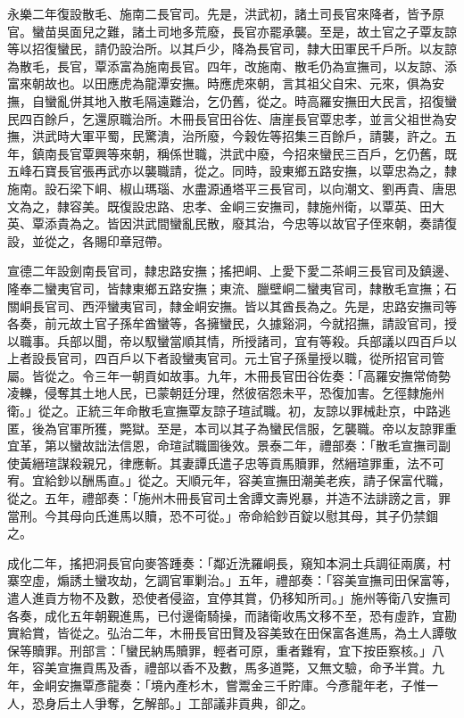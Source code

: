 \begin{pinyinscope}
永樂二年復設散毛、施南二長官司。先是，洪武初，諸土司長官來降者，皆予原官。蠻苗吳面兒之難，諸土司地多荒廢，長官亦罷承襲。至是，故土官之子覃友諒等以招復蠻民，請仍設治所。以其戶少，降為長官司，隸大田軍民千戶所。以友諒為散毛，長官，覃添富為施南長官。四年，改施南、散毛仍為宣撫司，以友諒、添富來朝故也。以田應虎為龍潭安撫。時應虎來朝，言其祖父自宋、元來，俱為安撫，自蠻亂併其地入散毛隔遠難治，乞仍舊，從之。時高羅安撫田大民言，招復蠻民四百餘戶，乞還原職治所。木冊長官田谷佐、唐崖長官覃忠孝，並言父祖世為安撫，洪武時大軍平蜀，民驚潰，治所廢，今穀佐等招集三百餘戶，請襲，許之。五年，鎮南長官覃興等來朝，稱係世職，洪武中廢，今招來蠻民三百戶，乞仍舊，既五峰石寶長官張再武亦以襲職請，從之。同時，設東鄉五路安撫，以覃忠為之，隸施南。設石梁下峒、椒山瑪瑙、水盡源通塔平三長官司，以向潮文、劉再貴、唐思文為之，隸容美。既復設忠路、忠孝、金峒三安撫司，隸施州衛，以覃英、田大英、覃添貴為之。皆因洪武間蠻亂民散，廢其治，今忠等以故官子侄來朝，奏請復設，並從之，各賜印章冠帶。

宣德二年設劍南長官司，隸忠路安撫；搖把峒、上愛下愛二茶峒三長官司及鎮邊、隆奉二蠻夷官司，皆隸東鄉五路安撫；東流、臘壁峒二蠻夷官司，隸散毛宣撫；石關峒長官司、西泙蠻夷官司，隸金峒安撫。皆以其酋長為之。先是，忠路安撫司等各奏，前元故土官子孫牟酋蠻等，各擁蠻民，久據谿洞，今就招撫，請設官司，授以職事。兵部以聞，帝以馭蠻當順其情，所授諸司，宜有等殺。兵部議以四百戶以上者設長官司，四百戶以下者設蠻夷官司。元土官子孫量授以職，從所招官司管屬。皆從之。令三年一朝貢如故事。九年，木冊長官田谷佐奏：「高羅安撫常倚勢凌轢，侵奪其土地人民，已蒙朝廷分理，然彼宿怨未平，恐復加害。乞徑隸施州衛。」從之。正統三年命散毛宣撫覃友諒子瑄試職。初，友諒以罪械赴京，中路逃匿，後為官軍所獲，斃獄。至是，本司以其子為蠻民信服，乞襲職。帝以友諒罪重宜革，第以蠻故詘法信恩，命瑄試職圖後效。景泰二年，禮部奏：「散毛宣撫司副使黃縉瑄謀殺親兄，律應斬。其妻譚氏遣子忠等貢馬贖罪，然縉瑄罪重，法不可宥。宜給鈔以酬馬直。」從之。天順元年，容美宣撫田潮美老疾，請子保富代職，從之。五年，禮部奏：「施州木冊長官司土舍譚文壽兇暴，并造不法誹謗之言，罪當刑。今其母向氏進馬以贖，恐不可從。」帝命給鈔百錠以慰其母，其子仍禁錮之。

成化二年，搖把洞長官向麥答踵奏：「鄰近洗羅峒長，窺知本洞土兵調征兩廣，村寨空虛，煽誘土蠻攻劫，乞調官軍剿治。」五年，禮部奏：「容美宣撫司田保富等，遣人進貢方物不及數，恐使者侵盜，宜停其賞，仍移知所司。」施州等衛八安撫司各奏，成化五年朝覲進馬，已付邊衛騎操，而諸衛收馬文移不至，恐有虛詐，宜勘實給賞，皆從之。弘治二年，木冊長官田賢及容美致在田保富各進馬，為土人譚敬保等贖罪。刑部言：「蠻民納馬贖罪，輕者可原，重者難宥，宜下按臣察核。」八年，容美宣撫貢馬及香，禮部以香不及數，馬多道斃，又無文驗，命予半賞。九年，金峒安撫覃彥龍奏：「境內產杉木，嘗鬻金三千貯庫。今彥龍年老，子惟一人，恐身后土人爭奪，乞解部。」工部議非貢典，卻之。


\end{pinyinscope}
